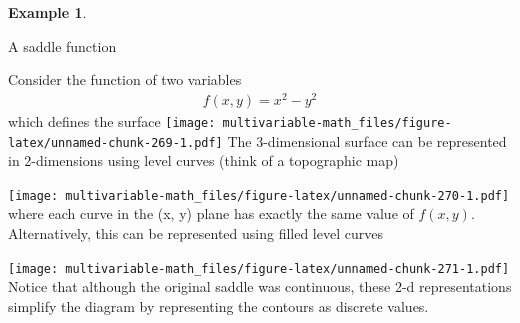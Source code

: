 \documentclass[
]{book}
\newenvironment{Shaded}{\begin{snugshade}}{\end{snugshade}}
\newcommand{\DataTypeTok}[1]{\textcolor[rgb]{0.13,0.29,0.53}{#1}}
\newcommand{\DecValTok}[1]{\textcolor[rgb]{0.00,0.00,0.81}{#1}}
\newcommand{\KeywordTok}[1]{\textcolor[rgb]{0.13,0.29,0.53}{\textbf{#1}}}
\newcommand{\NormalTok}[1]{#1}
\newcommand{\OperatorTok}[1]{\textcolor[rgb]{0.81,0.36,0.00}{\textbf{#1}}}
\newcommand{\StringTok}[1]{\textcolor[rgb]{0.31,0.60,0.02}{#1}}
\theoremstyle{definition}
\theoremstyle{definition}
\newtheorem{example}{Example}[chapter]
\theoremstyle{definition}
\theoremstyle{remark}
\begin{document}
\begin{example}
\protect\hypertarget{exm:unlabeled-div-203}{}\label{exm:unlabeled-div-203}

A saddle function

Consider the function of two variables
\[
\begin{aligned}
f(x, y) = x^2 - y^2
\end{aligned}
\]
which defines the surface
\texttt{[image: multivariable-math\_files/figure-latex/unnamed-chunk-269-1.pdf]}
The 3-dimensional surface can be represented in 2-dimensions using level curves (think of a topographic map)

\begin{Shaded}
\end{Shaded}

\texttt{[image: multivariable-math\_files/figure-latex/unnamed-chunk-270-1.pdf]}
where each curve in the (x, y) plane has exactly the same value of \(f(x, y)\). Alternatively, this can be represented using filled level curves

\begin{Shaded}
\end{Shaded}

\texttt{[image: multivariable-math\_files/figure-latex/unnamed-chunk-271-1.pdf]}
Notice that although the original saddle was continuous, these 2-d representations simplify the diagram by representing the contours as discrete values.

\end{example}
\end{document}
